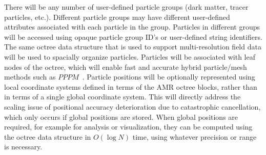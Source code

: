 \documentclass[11pt,letterpaper]{article}
\begin{document}
%
There will be any number of user-defined particle groups (dark matter,
tracer particles, etc.).  Different particle groups may have different
user-defined attributes associated with each particle in the group.
Particles in different groups will be accessed using opaque particle
group ID's or user-defined string identifiers.
%
The same octree data structure that is used to support
multi-resolution field data will be used to spacially organize
particles.  Particles will be associated with leaf nodes of the
octree, which will enable fast and accurate hybrid particle/mesh
methods such as $PPPM$~\cite{HoEa88}.
%
Particle positions will be optionally represented using local
coordinate systems defined in terms of the AMR octree blocks, rather
than in terms of a single global coordinate system.
This will directly address the scaling issue of positional accuracy
deterioration due to catastrophic cancellation, which only occurs if
global positions are stored.  When global positions are required, for
example for analysis or visualization, they can be computed using the
octree data structure in $O(\log N)$ time, using whatever precision or
range is necessary.


\end{document}
